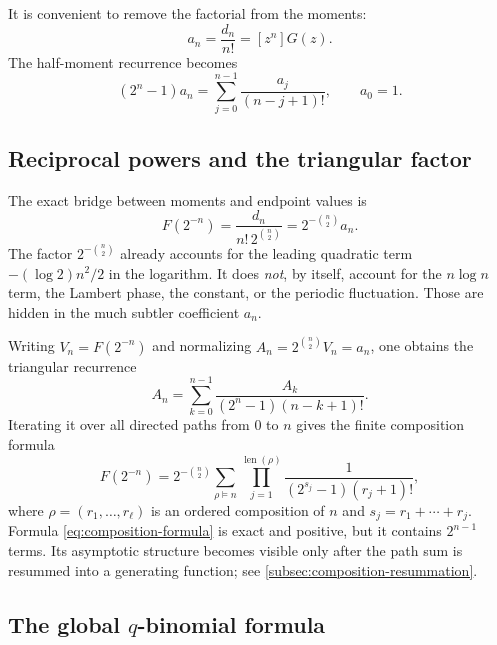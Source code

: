 \documentclass[11pt,oneside]{article}
\theoremstyle{definition}
\theoremstyle{remark}
\begin{document}
It is convenient to remove the factorial from the moments:
\begin{equation}
 a_n=\frac{d_n}{n!}=[z^n]G(z).
\label{eq:a-def}
\end{equation}
The half-moment recurrence becomes
\begin{equation}
 (2^n-1)a_n=
 \sum_{j=0}^{n-1}\frac{a_j}{(n-j+1)!},
 \qquad a_0=1.
\label{eq:a-recurrence}
\end{equation}

\subsection{Reciprocal powers and the triangular factor}

The exact bridge between moments and endpoint values is
\begin{equation}
 \boxed{
 F(2^{-n})=\frac{d_n}{n!\,2^{\binom n2}}
 =2^{-\binom n2}a_n.}
\label{eq:inverse-exact}
\end{equation}
The factor $2^{-\binom n2}$ already accounts for the leading quadratic term
$-(\log2)n^2/2$ in the logarithm.  It does \emph{not}, by itself, account for the
$n\log n$ term, the Lambert phase, the constant, or the periodic fluctuation.  Those are hidden in the much subtler coefficient $a_n$.

Writing $V_n=F(2^{-n})$ and normalizing
$A_n=2^{\binom n2}V_n=a_n$, one obtains the triangular recurrence
\begin{equation}
 A_n=\sum_{k=0}^{n-1}
 \frac{A_k}{(2^n-1)(n-k+1)!}.
\label{eq:normalized-triangular}
\end{equation}
Iterating it over all directed paths from $0$ to $n$ gives the finite composition formula
\begin{equation}
 F(2^{-n})=2^{-\binom n2}
 \sum_{\rho\vDash n}
 \prod_{j=1}^{\operatorname{len}(\rho)}
 \frac1{(2^{s_j}-1)(r_j+1)!},
\label{eq:composition-formula}
\end{equation}
where $\rho=(r_1,\ldots,r_\ell)$ is an ordered composition of $n$ and
$s_j=r_1+\cdots+r_j$.  Formula \eqref{eq:composition-formula} is exact and positive, but it contains $2^{n-1}$ terms.  Its asymptotic structure becomes visible only after the path sum is resummed into a generating function; see \cref{subsec:composition-resummation}.

\subsection{The global $q$-binomial formula}
\label{subsec:qformula}
\end{document}
